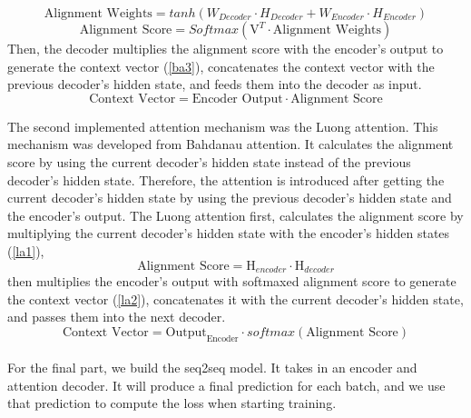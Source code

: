 \documentclass[conference]{IEEEtran}
\begin{document}
\begin{dmath}
    \label{ba1}
    \text{Alignment Weights} = tanh(W_{Decoder} \cdot H_{Decoder} + W_{Encoder} \cdot H_{Encoder})
\end{dmath}  
\begin{equation}
    \label{ba2}
\text{Alignment Score} = Softmax(\mathrm{V}_{}^{T} \cdot \text{Alignment Weights})
\end{equation}  
 Then, the decoder multiplies the alignment score with the encoder’s output to generate the context vector (\ref{ba3}), concatenates the context vector with the previous decoder’s hidden state, and feeds them into the decoder as input.
\begin{dmath}
    \label{ba3}
\text{Context Vector} = \text{Encoder Output} \cdot \text{Alignment Score}
\end{dmath}  

\indent The second implemented attention mechanism was the Luong attention. This mechanism was developed from Bahdanau attention. It calculates the alignment score by using the current decoder’s hidden state instead of the previous decoder’s hidden state. Therefore, the attention is introduced after getting the current decoder’s hidden state by using the previous decoder’s hidden state and the encoder’s output. The Luong attention first, calculates the alignment score by multiplying the current decoder’s hidden state with the encoder’s hidden states (\ref{la1}),
\begin{equation}
    \label{la1}
    \text{Alignment Score} = \mathrm{H}_{encoder}^{} \cdot \mathrm{H}_{decoder}^{}
\end{equation}  
then multiplies the encoder's output with softmaxed alignment score to generate the context vector (\ref{la2}), concatenates it with the current decoder’s hidden state, and passes them into the next decoder.
\begin{equation}
    \label{la2}
    \text{Context Vector} = \mathrm{Output}_{\text{Encoder}}^{} \cdot softmax(\text{Alignment Score})
\end{equation}  
\\
\indent For the final part, we build the seq2seq model. It takes in an encoder and attention decoder. It will produce a final prediction for each batch, and we use that prediction to compute the loss when starting training. 
\end{document}
